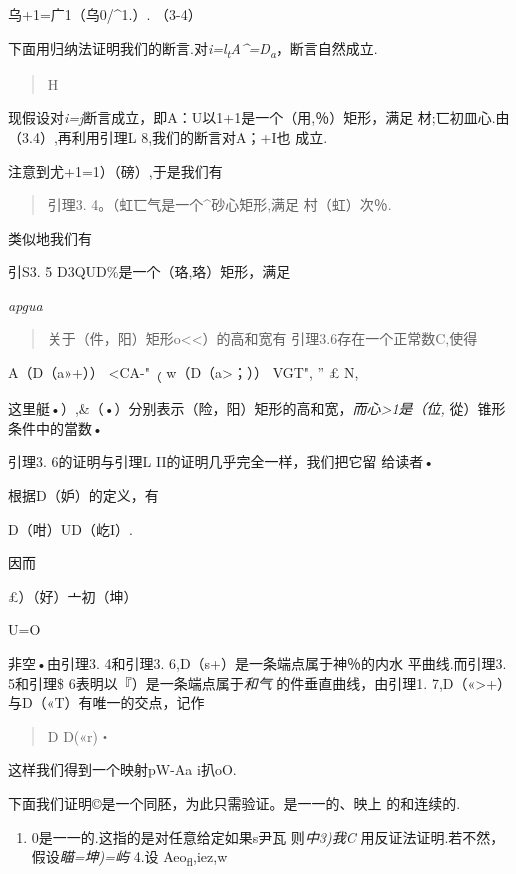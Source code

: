 \documentclass{article}
\begin{document}
乌+1=广1（乌0/\^{}1.）. （3-4）

下面用归纳法证明我们的断言.对\emph{i=l\textsubscript{t}A\^{}=D\textsubscript{a}}，断言自然成立.

\begin{quote}
H
\end{quote}

现假设对\emph{i=j}断言成立，即A：U以1+1是一个（用,％）矩形，满足
材;匸初皿心.由（3.4）,再利用引理L 8,我们的断言对A；+I也 成立.

注意到尤+1=1）（磅）,于是我们有

\begin{quote}
引理3. 4。（虹匸气是一个\^{}砂心矩形,满足 村（虹）次％.
\end{quote}

类似地我们有

引S3. 5 D3QUD\%是一个（珞,珞）矩形，满足

\emph{apgua}

\begin{quote}
关于（件，阳）矩形o\textless{}\textless{}）的高和宽有
引理3.6存在一个正常数C,使得
\end{quote}

A（D（a»+）） \textless{}CA-"\textsubscript{（}
w（D（a\textgreater{}；）） VGT", '' £ N,

这里艇•）,\&（•）分别表示（险，阳）矩形的高和宽，\emph{而心\textgreater{}1是（位,}
從）锥形条件中的當数•

引理3. 6的证明与引理L II的证明几乎完全一样，我们把它留 给读者•

根据D（妒）的定义，有

D（咁）UD（屹I）.

因而

£）（好）亠初（坤）

U=O

非空•由引理3. 4和引理3. 6,D（s+）是一条端点属于神％的内水
平曲线.而引理3. 5和引理\$ 6表明以『）是一条端点属于\emph{和气}
的件垂直曲线，由引理1.
7,D（«\textgreater{}+）与D（«T）有唯一的交点，记作

\begin{quote}
D D(«r)・
\end{quote}

这样我们得到一个映射pW-Aa i扒oO.

下面我们证明©是一个同胚，为此只需验证。是一一的、映上 的和连续的.

\begin{enumerate}
\def\labelenumi{\arabic{enumi}.}
\item
  0是一一的.这指的是对任意给定如果s尹瓦 则\emph{中3)我C}
  用反证法证明.若不然，假设\emph{瞄=坤)=屿} 4.设
  Aeo\textsubscript{fl},iez,w
\end{enumerate}
\end{document}
